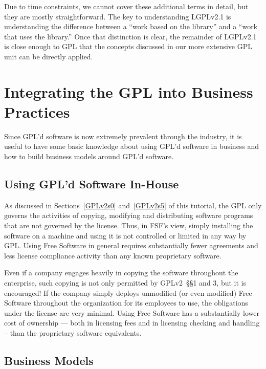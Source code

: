 Due to time constraints, we cannot cover these additional terms in detail,
but they are mostly straightforward. The key to understanding LGPLv2.1 is
understanding the difference between a ``work based on the library'' and a
``work that uses the library.''  Once that distinction is clear, the
remainder of LGPLv2.1 is close enough to GPL that the concepts discussed in
our more extensive GPL unit can be directly applied.

\chapter{Integrating the GPL into Business Practices}

Since GPL'd software is now extremely prevalent through the industry, it
is useful to have some basic knowledge about using GPL'd software in
business and how to build business models around GPL'd software.

\section{Using GPL'd Software In-House}

As discussed in Sections~\ref{GPLv2s0} and~\ref{GPLv2s5} of this tutorial,
the GPL only governs the activities of copying, modifying and
distributing software programs that are not governed by the license.
Thus, in FSF's view, simply installing the software on a machine and
using it is not controlled or limited in any way by GPL\@. Using Free
Software in general requires substantially fewer agreements and less
license compliance activity than any known proprietary software.

Even if a company engages heavily in copying the software throughout the
enterprise, such copying is not only permitted by GPLv2~\S\S1 and 3, but it is
encouraged!  If the company simply deploys unmodified (or even modified)
Free Software throughout the organization for its employees to use, the
obligations under the license are very minimal. Using Free Software has a
substantially lower cost of ownership --- both in licensing fees and in
licensing checking and handling -- than the proprietary software
equivalents.

\section{Business Models}
\label{Business Models}

